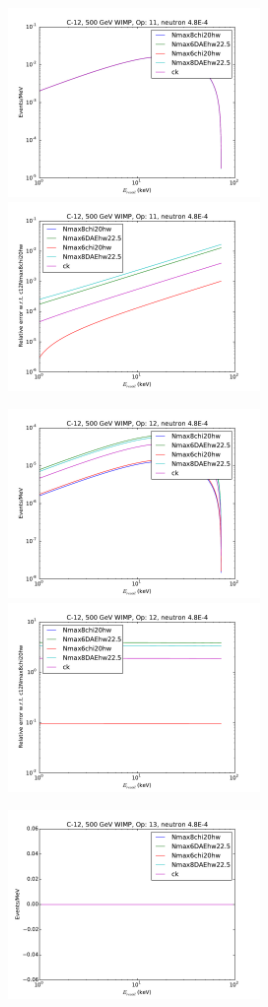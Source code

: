 \documentclass{article}
\begin{document}
\includegraphics[width=0.5\textwidth]{c12-o11}
\includegraphics[width=0.5\textwidth]{c12-o11-relerr}

\includegraphics[width=0.5\textwidth]{c12-o12}
\includegraphics[width=0.5\textwidth]{c12-o12-relerr}

\includegraphics[width=0.5\textwidth]{c12-o13}
\end{document}
